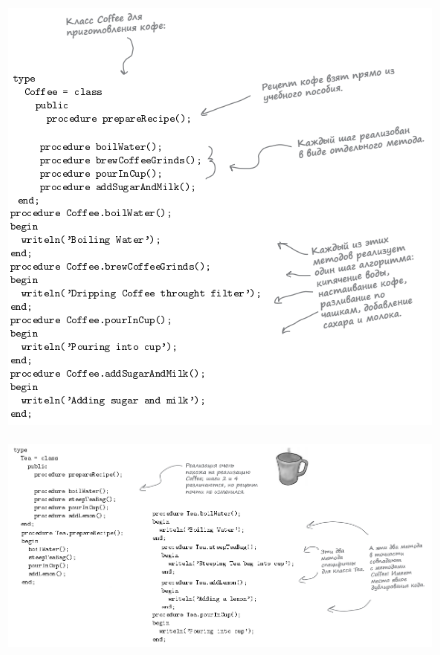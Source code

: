 \documentclass{beamer}
\begin{document}
\begin{frame}
\begin{figure}[h]
\centering
\includegraphics[scale=0.6]{images/lec12-pic03.png}
\label{pic-sort}
\end{figure}
\end{frame}

\begin{frame}
\begin{figure}[h]
\centering
\includegraphics[scale=0.5]{images/lec12-pic04.png}
\label{pic-sort}
\end{figure}
\end{frame}
\end{document}
